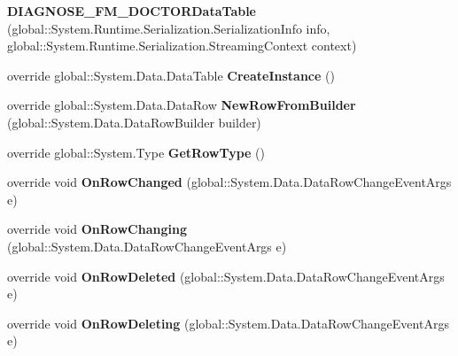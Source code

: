\begin{CompactItemize}
\item 
\textbf{DIAGNOSE\_\-FM\_\-DOCTORDataTable} (global::System.Runtime.Serialization.SerializationInfo info, global::System.Runtime.Serialization.StreamingContext context)\label{class_automatic_medical_system_1_1_data_set1_1_1_d_i_a_g_n_o_s_e___f_m___d_o_c_t_o_r_data_table_32e279e00edd1f71a32d890a1e123e32}

\item 
override global::System.Data.DataTable \textbf{CreateInstance} ()\label{class_automatic_medical_system_1_1_data_set1_1_1_d_i_a_g_n_o_s_e___f_m___d_o_c_t_o_r_data_table_7c0589e2b504980870fc2474c2900d60}

\item 
override global::System.Data.DataRow \textbf{NewRowFromBuilder} (global::System.Data.DataRowBuilder builder)\label{class_automatic_medical_system_1_1_data_set1_1_1_d_i_a_g_n_o_s_e___f_m___d_o_c_t_o_r_data_table_e60355f60d0e9bb7e1396f8b8bf57477}

\item 
override global::System.Type \textbf{GetRowType} ()\label{class_automatic_medical_system_1_1_data_set1_1_1_d_i_a_g_n_o_s_e___f_m___d_o_c_t_o_r_data_table_06ea14e23555aa65688d484b703fd096}

\item 
override void \textbf{OnRowChanged} (global::System.Data.DataRowChangeEventArgs e)\label{class_automatic_medical_system_1_1_data_set1_1_1_d_i_a_g_n_o_s_e___f_m___d_o_c_t_o_r_data_table_8bc5b1dd254185cba3155de801e8fd07}

\item 
override void \textbf{OnRowChanging} (global::System.Data.DataRowChangeEventArgs e)\label{class_automatic_medical_system_1_1_data_set1_1_1_d_i_a_g_n_o_s_e___f_m___d_o_c_t_o_r_data_table_ca7534de97fb2d7a737db6c5d8fda2c0}

\item 
override void \textbf{OnRowDeleted} (global::System.Data.DataRowChangeEventArgs e)\label{class_automatic_medical_system_1_1_data_set1_1_1_d_i_a_g_n_o_s_e___f_m___d_o_c_t_o_r_data_table_b6ac865edabde77452513347f0566337}

\item 
override void \textbf{OnRowDeleting} (global::System.Data.DataRowChangeEventArgs e)\label{class_automatic_medical_system_1_1_data_set1_1_1_d_i_a_g_n_o_s_e___f_m___d_o_c_t_o_r_data_table_2031c9aa399e42181082cc6683df10fe}

\end{CompactItemize}
